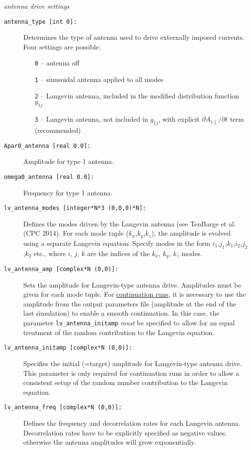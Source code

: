\documentclass[12pt]{article}
\begin{document}
%
{\noindent\em antenna drive settings}
\begin{description}
\item[\hypertarget{antenna_type}{\tt antenna\_type [int 0]:}] Determines the type of antenna used to
drive externally imposed currents. Four settings are possible:
\begin{itemize}
\item[{\tt 0}] -- antenna off
\item[{\tt 1}] -- sinusoidal antenna applied to all modes
\item[{\tt 2}] -- Langevin antenna, included in the modified distribution function $g_{1j}$
\item[{\tt 3}] -- Langevin antenna, not included in $g_{1j}$, with explicit $\partial A_{1\|}/\partial t$ term (recommended)
\end{itemize}
\item[\hypertarget{Apar0_antenna}{\tt Apar0\_antenna [real 0.0]:}] Amplitude for type 1 antenna.
\item[\hypertarget{omega0_antenna}{\tt omega0\_antenna [real 0.0]:}] Frequency for type 1 antenna.
\item[\hypertarget{lv_antenna_modes}{\tt lv\_antenna\_modes [integer*N*3 (0,0,0)*N]:}] Defines the
modes driven by the Langevin antenna (see TenBarge et al. (CPC 2014). For each mode tuple ($k_x$,$k_y$,$k_z$),
the amplitude is evolved using a separate Langevin equation. Specify modes in the form
$i_1$,$j_1$,$k_1$,$i_2$,$j_2$,$k_2$ etc., where $i$, $j$, $k$ are the indices of the $k_x$, $k_y$, $k_z$ modes.
\item[\hypertarget{lv_antenna_amp}{\tt lv\_antenna\_amp [complex*N (0,0)]:}] Sets the amplitude for
Langevin-type antenna drive. Amplitudes must be given for each mode tuple. For \hyperref[subsubsec:continue_sim]{continuation runs}, it is
necessary to use the amplitude from the output parameters file (amplitude at the end of the last simulation)
to enable a smooth continuation. In this case, the parameter {\tt lv\_antenna\_initamp} {\em must} be
specified to allow for an equal treatment of the random contribution to the Langevin equation.
\item[\hypertarget{lv_antenna_initamp}{\tt lv\_antenna\_initamp [complex*N (0,0)]:}] Specifies the initial
(=target) amplitude for Langevin-type antenna drive. This parameter is only required for continuation runs in order
to allow a consistent setup of the random number contribution to the Langevin equation.
\item[\hypertarget{lv_antenna_freq}{\tt lv\_antenna\_freq [complex*N (0,0)]:}] Defines the frequency and
decorrelation rates for each Langevin antenna. Decorrelation rates have to be explicitly specified as
negative values, otherwise the antenna amplitudes will grow exponentially.
\end{description}
\end{document}
